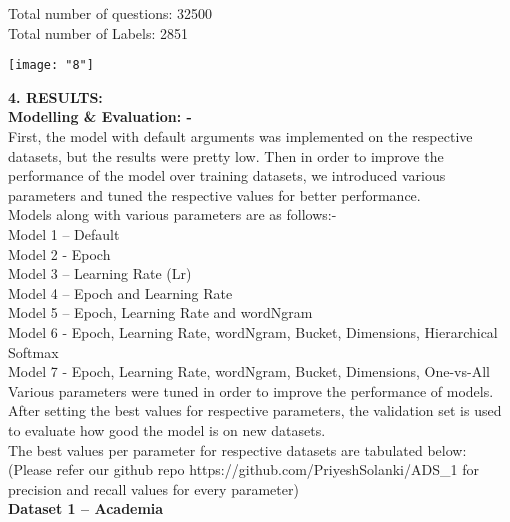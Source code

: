 \documentclass[12pt]{article}
\begin{document}
\noindent Total number of questions: 32500\\
Total number of Labels: 2851


\begin{center}
	\begin{minipage}{\linewidth}
		\centering
		\texttt{[image: "8"]}
		
	\end{minipage}
\end{center}

\noindent\textbf{4.	RESULTS: }\\

\noindent\textbf{Modelling \& Evaluation: -}\\

\noindent First, the model with default arguments was implemented on the respective datasets, but the results were pretty low.
Then in order to improve the performance of the model over training datasets, we introduced various parameters and tuned the respective values for better performance.\\

\noindent Models along with various parameters are as follows:-\\
Model 1 – Default\\
Model 2 - Epoch\\
Model 3 – Learning Rate (Lr)\\
Model 4 – Epoch and Learning Rate\\
Model 5 – Epoch, Learning Rate and wordNgram\\
Model 6 - Epoch, Learning Rate, wordNgram, Bucket, Dimensions, Hierarchical Softmax\\
Model 7 - Epoch, Learning Rate, wordNgram, Bucket, Dimensions, One-vs-All\\

\noindent Various parameters were tuned in order to improve the performance of models. After setting the best values for respective parameters, the validation set is used to evaluate how good the model is on new datasets.\\

\noindent The best values per parameter for respective datasets are tabulated below:
(Please refer our github repo https://github.com/PriyeshSolanki/ADS\_1 for precision and recall values for every parameter)\\

 

\noindent\textbf{Dataset 1 – Academia}
\end{document}
